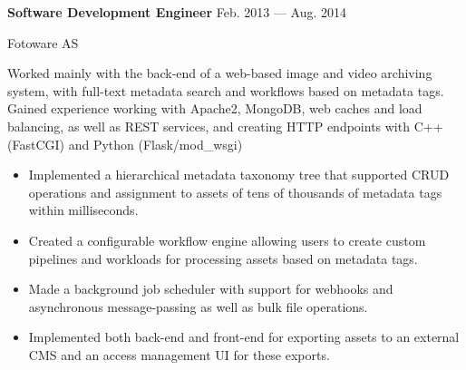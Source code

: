 \parbox[t][][t]{\linewidth}{
	\parbox{\linewidth}{{\textbf{Software Development Engineer}}
		\hfill {{Feb. 2013 --- Aug. 2014}}}
		\smallbreak
	\parbox{\linewidth}{Fotoware AS}

	\bigskip
	Worked mainly with the back-end of a web-based image and video
	archiving system, with full-text metadata search and workflows based on
	metadata tags. Gained experience working with Apache2, MongoDB, web
	caches and load balancing, as well as REST services, and creating HTTP endpoints with C++ (FastCGI)
	and Python (Flask/mod\_wsgi)

	\bigskip
	\begin{itemize}
		\item{Implemented a hierarchical metadata taxonomy tree that
			supported CRUD operations and assignment to assets of tens of thousands of metadata tags within
			milliseconds.}\\[-.6em]
		\item{Created a configurable workflow engine allowing users to
			create custom pipelines and workloads for processing assets based on
			metadata tags.}\\[-.6em]
		\item{Made a background job scheduler with support for
			webhooks and asynchronous message-passing as well as
			bulk file operations.}\\[-.6em]
		\item{Implemented both back-end and front-end for exporting
			assets to an external CMS and an access 
			management UI for these exports.}\\[-.6em]
	\end{itemize}
}

